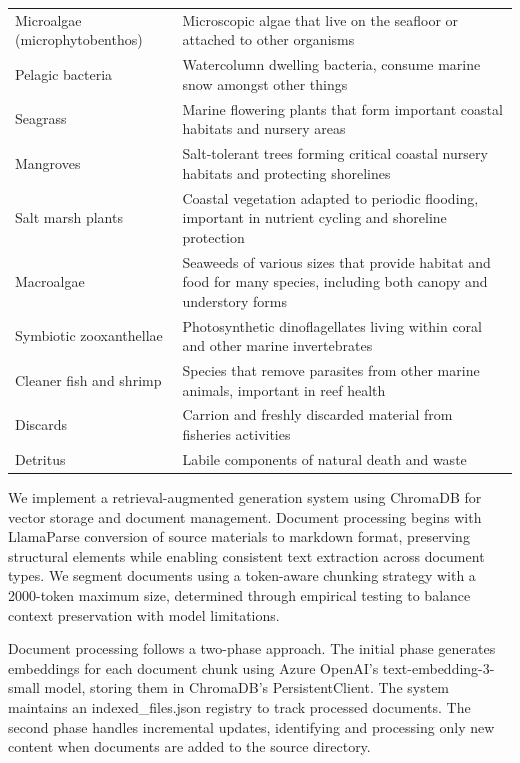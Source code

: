 \begin{longtable}{p{}p{}}
  Microalgae (microphytobenthos) & Microscopic algae that live on the seafloor or attached to other organisms \\
  Pelagic bacteria & Watercolumn dwelling bacteria, consume marine snow amongst other things \\
  Seagrass & Marine flowering plants that form important coastal habitats and nursery areas \\
  Mangroves & Salt-tolerant trees forming critical coastal nursery habitats and protecting shorelines \\
  Salt marsh plants & Coastal vegetation adapted to periodic flooding, important in nutrient cycling and shoreline protection \\
  Macroalgae & Seaweeds of various sizes that provide habitat and food for many species, including both canopy and understory forms \\
  Symbiotic zooxanthellae & Photosynthetic dinoflagellates living within coral and other marine invertebrates \\
  Cleaner fish and shrimp & Species that remove parasites from other marine animals, important in reef health \\
  Discards & Carrion and freshly discarded material from fisheries activities \\
  Detritus & Labile components of natural death and waste \\
  \end{longtable}
  
  \label{supp:rag_implementation}
  
  We implement a retrieval-augmented generation system using ChromaDB for vector storage and document management. Document processing begins with LlamaParse conversion of source materials to markdown format, preserving structural elements while enabling consistent text extraction across document types. We segment documents using a token-aware chunking strategy with a 2000-token maximum size, determined through empirical testing to balance context preservation with model limitations.
  
  Document processing follows a two-phase approach. The initial phase generates embeddings for each document chunk using Azure OpenAI's text-embedding-3-small model, storing them in ChromaDB's PersistentClient. The system maintains an indexed\_files.json registry to track processed documents. The second phase handles incremental updates, identifying and processing only new content when documents are added to the source directory.
  
